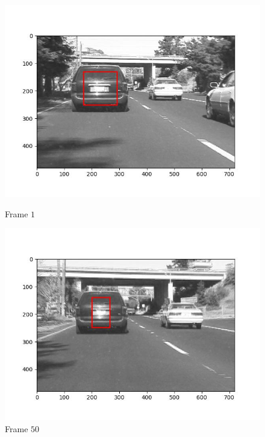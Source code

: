 \begin{figure}[H]
  \centering
  \begin{minipage}{.49\textwidth}
    \centering
    \includegraphics[width=\textwidth]{./figures/ic_affine/car1/frame000001.jpg}
    \caption{Frame $1$}
  \end{minipage}
  \hfill
  \begin{minipage}{.49\textwidth}
    \centering
    \includegraphics[width=\textwidth]{./figures/ic_affine/car1/frame000050.jpg}
    \caption{Frame $50$}
  \end{minipage}
  \hfill
  \begin{minipage}{.49\textwidth}
    \centering

\end{minipage}
\end{figure}
